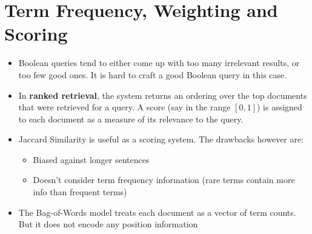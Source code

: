 \documentclass{article}
\begin{document}
\section{Term Frequency, Weighting and Scoring}
\begin{itemize}
    \item Boolean queries tend to either come up with too many irrelevant results, or too few good ones. It is hard to craft a good Boolean query in this case. 
    
    \item In \textbf{ranked retrieval}, the system returns an ordering over the top documents that were retrieved for a query. A score (say in the range $[0, 1]$) is assigned to each document as a measure of its relevance to the query.
    
    \item Jaccard Similarity is useful as a scoring system. The drawbacks however are:
    \begin{itemize}
        \item Biased against longer sentences
        
        \item Doesn't consider term frequency information (rare terms contain more info than frequent terms)
    \end{itemize}
    
    \item The Bag-of-Words model treats each document as a vector of term counts. But it does not encode any position information
\end{itemize}
\end{document}
